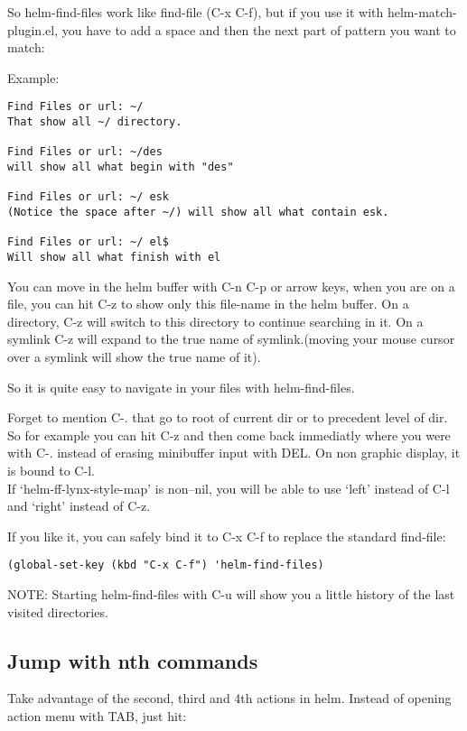 \documentclass[a4paper,11pt]{article}
\begin{document}
So helm-find-files work like find-file (C-x C-f), but if you use it
with helm-match-plugin.el, you have to add a space and then the next
part of pattern you want to match:

Example:

\begin{verbatim}
Find Files or url: ~/
That show all ~/ directory.

Find Files or url: ~/des
will show all what begin with "des"

Find Files or url: ~/ esk
(Notice the space after ~/) will show all what contain esk.

Find Files or url: ~/ el$
Will show all what finish with el

\end{verbatim}
You can move in the helm buffer with C-n C-p or arrow keys, when you
are on a file, you can hit C-z to show only this file-name in the
helm buffer.
On a directory, C-z will switch to this directory to continue searching
in it.
On a symlink C-z will expand to the true name of symlink.(moving your
mouse cursor over a symlink will show the true name of it).

So it is quite easy to navigate in your files with helm-find-files.

Forget to mention C-. that go to root of current dir or to precedent
level of dir.
So for example you can hit C-z and then come back immediatly where you
were with C-. instead of erasing minibuffer input with DEL.
On non graphic display, it is bound to C-l.\\
If `helm-ff-lynx-style-map' is non--nil, you will be able to use `left' instead of C-l and `right' instead of C-z.

If you like it, you can safely bind it to C-x C-f to replace the standard
find-file:

\begin{verbatim}
(global-set-key (kbd "C-x C-f") 'helm-find-files)
\end{verbatim}

NOTE:
Starting helm-find-files with C-u will show you a little history of the last visited directories.


\subsection{Jump with nth commands}
\label{sec:jump-with-nth}
Take advantage of the second, third and 4th actions in helm.
Instead of opening action menu with TAB, just hit:
\end{document}

